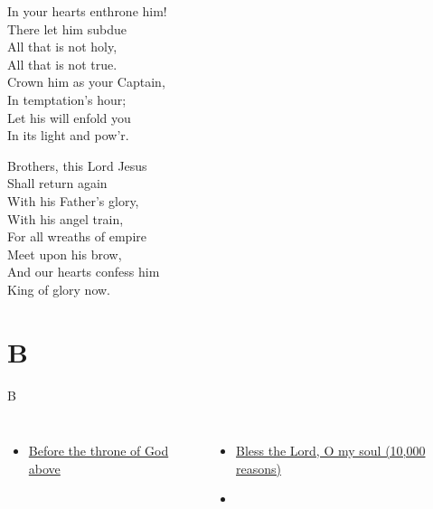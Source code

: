 \documentclass{beamer}
\begin{document}
{\begin{frame}{}
\end{frame}

\hypertarget{At the name of Jesus[]3}{}
\begin{frame}{}
\fontsize{ 18 }{ 23 }\selectfont

In your hearts enthrone him!\\ 
There let him subdue\\ 
All that is not holy,\\ 
All that is not true.\\ 
Crown him as your Captain,\\ 
In temptation's hour;\\ 
Let his will enfold you\\ 
In its light and pow'r. 

\end{frame}

\hypertarget{At the name of Jesus[]4}{}
\begin{frame}{}
\fontsize{ 18 }{ 23 }\selectfont

Brothers, this Lord Jesus\\ 
Shall return again\\ 
With his Father's glory,\\ 
With his angel train,\\ 
For all wreaths of empire\\ 
Meet upon his brow,\\ 
And our hearts confess him\\ 
King of glory now. 

\end{frame}

}
 
\section{B}

\begin{frame}[t]{B}
\begin{columns}[t]
        \begin{itemize}
    \item \hyperlink{Before the throne of God above[]}{Before the throne of God above } \phantom{ 1 1}
\end{itemize}
        \begin{itemize}
            \item \hyperlink{10,000 reasons['Bless the Lord, O my soul']}{Bless the Lord, O my soul (10,000 reasons)} \phantom{}
    \item[] \phantom{1}\end{itemize}


\end{columns}

\end{frame}
\end{document}
